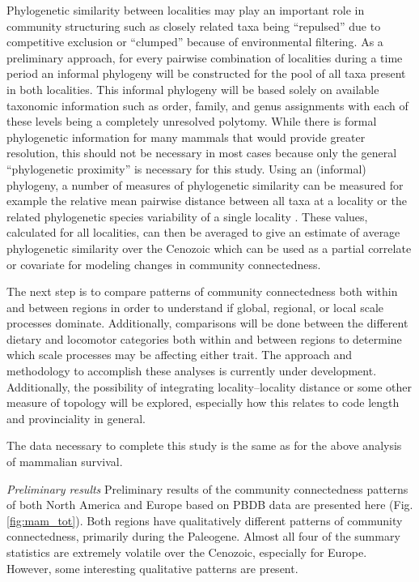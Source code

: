 \documentclass[12pt,letterpaper]{article}
\begin{document}
Phylogenetic similarity between localities may play an important role in community structuring \citep{Webb2002} such as closely related taxa being ``repulsed'' due to competitive exclusion or ``clumped'' because of environmental filtering. As a preliminary approach, for every pairwise combination of localities during a time period an informal phylogeny will be constructed for the pool of all taxa present in both localities. This informal phylogeny will be based solely on available taxonomic information such as order, family, and genus assignments with each of these levels being a completely unresolved polytomy. While there is formal phylogenetic information for many mammals that would provide greater resolution, this should not be necessary in most cases because only the general ``phylogenetic proximity'' is necessary for this study. Using an (informal) phylogeny, a number of measures of phylogenetic similarity can be measured for example the relative mean pairwise distance between all taxa at a locality \citep{Webb2002} or the related phylogenetic species variability of a single locality \citet{Helmus2007a}. These values, calculated for all localities, can then be averaged to give an estimate of average phylogenetic similarity over the Cenozoic which can be used as a partial correlate or covariate for modeling changes in community connectedness.

The next step is to compare patterns of community connectedness both within and between regions in order to understand if global, regional, or local scale processes dominate. Additionally, comparisons will be done between the different dietary and locomotor categories both within and between regions to determine which scale processes may be affecting either trait. The approach and methodology to accomplish these analyses is currently under development. Additionally, the possibility of integrating locality--locality distance or some other measure of topology will be explored, especially how this relates to code length and provinciality in general.

The data necessary to complete this study is the same as for the above analysis of mammalian survival.

\textit{Preliminary results}
Preliminary results of the community connectedness patterns of both North America and Europe based on PBDB data are presented here (Fig. \ref{fig:mam_tot}). Both regions have qualitatively different patterns of community connectedness, primarily during the Paleogene. Almost all four of the summary statistics are extremely volatile over the Cenozoic, especially for Europe. However, some interesting qualitative patterns are present.
\end{document}
